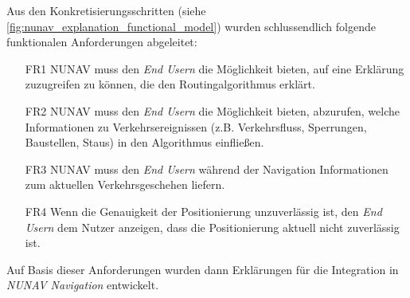 Aus den Konkretisierungsschritten (siehe \autoref{fig:nunav_explanation_functional_model}) wurden schlussendlich folgende funktionalen Anforderungen abgeleitet:

\begin{enumerate}
    \item [FR1] NUNAV muss den \textit{End Usern} die Möglichkeit bieten, auf eine Erklärung zuzugreifen zu können, die den Routingalgorithmus erklärt.
    \item [FR2] NUNAV muss den \textit{End Usern} die Möglichkeit bieten, abzurufen, welche Informationen zu Verkehrsereignissen (z.B. Verkehrsfluss, Sperrungen, Baustellen, Staus) in den Algorithmus einfließen.
    \item [FR3] NUNAV muss den \textit{End Usern} während der Navigation Informationen zum aktuellen Verkehrsgeschehen liefern.
    \item [FR4] Wenn die Genauigkeit der Positionierung unzuverlässig ist, den \textit{End Usern} dem Nutzer anzeigen, dass die Positionierung aktuell nicht zuverlässig ist.
\end{enumerate}

Auf Basis dieser Anforderungen wurden dann Erklärungen für die Integration in \textit{NUNAV Navigation} entwickelt.